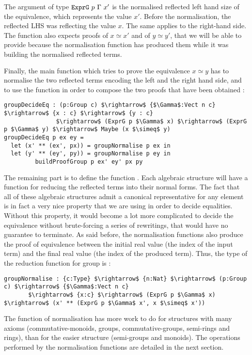 The argument of type $\code{ExprG}\ p\ \Gamma\ x'$ is the normalised reflected left hand size of the equivalence, which represents the value $x'$. Before the normalisation, the reflected LHS was reflecting the value $x$. The same applies to the right-hand side. The function also expects proofs of $x \simeq x'$ and of $y \simeq y'$, that we will be able to provide because the normalisation function has produced them while it was building the normalised reflected terms.


Finally, the main function which tries to prove the equivalence $x \simeq y$ has to normalise the two reflected terms encoding the left and the right hand side, and to use the function  in order to compose the two proofs that have been obtained :

\begin{lstlisting}
groupDecideEq : (p:Group c) $\rightarrow$ {$\Gamma$:Vect n c} $\rightarrow$ {x : c} $\rightarrow$ {y : c} 
               $\rightarrow$ (ExprG p $\Gamma$ x) $\rightarrow$ (ExprG p $\Gamma$ y) $\rightarrow$ Maybe (x $\simeq$ y)
groupDecideEq p ex ey =
  let (x' ** (ex', px)) = groupNormalise p ex in
  let (y' ** (ey', py)) = groupNormalise p ey in
	     buildProofGroup p ex' ey' px py
\end{lstlisting}


The remaining part is to define the function . Each algebraic structure will have a function for reducing the reflected terms into their normal forms. The fact that all of these algebraic structures admit a canonical representative for any element is in fact a very nice property that we are using in order to decide equalities. Without this property, it would become a lot more complicated to decide the equivalence without brute-forcing a series of rewritings, that would have no guarantee to terminate.
As said before, the normalisation functions also produce the proof of equivalence between the initial real value (the index of the input term) and the final real value (the index of the produced term). Thus, the type of the reduction function for group is :


\begin{lstlisting}
groupNormalise : {c:Type} $\rightarrow$ {n:Nat} $\rightarrow$ (p:Group c) $\rightarrow$ {$\Gamma$:Vect n c} 
       $\rightarrow$ {x:c} $\rightarrow$ (ExprG p $\Gamma$ x) $\rightarrow$ (x' ** (ExprG p $\Gamma$ x', x $\simeq$ x'))
\end{lstlisting}


The function of normalisation has more work to do for structures with many axioms (commutative-monoids, groups, commutative-groups, semi-rings and rings), than for the easier structure (semi-groups and monoids).
The operations performed by the normalisation functions are detailed in the next section.


